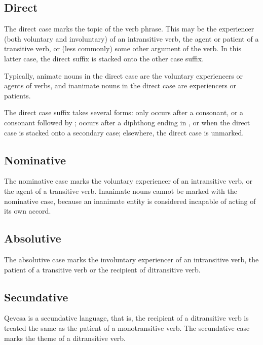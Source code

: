 \documentclass[grammar]{subfiles}
\begin{document}
\subsection{Direct}
\label{ssec:ns_direct_case}

The direct case marks the topic of the verb phrase.  This may be the
experiencer (both voluntary and involuntary) of an intransitive verb, the agent
or patient of a transitive verb, or (less commonly) some other argument of the
verb.  In this latter case, the direct suffix is stacked onto the other case
suffix. 

Typically, animate nouns in the direct case are the voluntary experiencers or
agents of verbs, and inanimate nouns in the direct case are experiencers or
patients. 

The direct case suffix takes several forms:  only occurs after a
consonant, or a consonant followed by ;  occurs after a diphthong
ending in , or when the direct case is stacked onto a secondary case;
elsewhere, the direct case is unmarked.


\subsection{Nominative}
\label{ssec:ns_nominative_case}

The nominative case marks the voluntary experiencer of an intransitive verb, or
the agent of a transitive verb.  Inanimate nouns cannot be marked with the
nominative case, because an inanimate entity is considered incapable of acting
of its own accord. 


\subsection{Absolutive}
\label{ssec:ns_absolutive_case}

The absolutive case marks the involuntary experiencer of an intransitive verb,
the patient of a transitive verb or the recipient of ditransitive verb.


\subsection{Secundative}
\label{ssec:ns_secundative_case}

Qevesa is a secundative language, that is, the recipient of a ditransitive verb
is treated the same as the patient of a monotransitive verb. The secundative
case marks the theme of a ditransitive verb.
\end{document}
